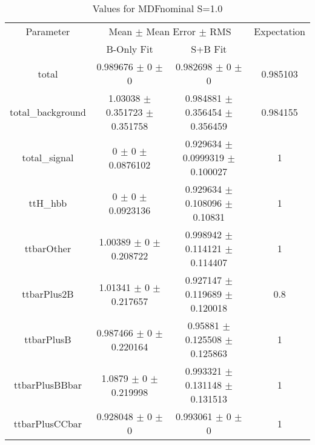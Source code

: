 \begin{table}
\centering
\caption{Values for MDFnominal S=1.0}
\begin{tabular}{cccc}
\toprule
Parameter & \multicolumn{2}{c}{Mean $\pm$ Mean Error $\pm$ RMS} & Expectation\\
 & B-Only Fit & S+B Fit & \\
\midrule
total & \num{0.989676} $\pm$ \num{0} $\pm$ \num{0} & \num{0.982698} $\pm$ \num{0} $\pm$ \num{0} & \num{0.985103}\\
total\_background & \num{1.03038} $\pm$ \num{0.351723} $\pm$ \num{0.351758} & \num{0.984881} $\pm$ \num{0.356454} $\pm$ \num{0.356459} & \num{0.984155}\\
total\_signal & \num{0} $\pm$ \num{0} $\pm$ \num{0.0876102} & \num{0.929634} $\pm$ \num{0.0999319} $\pm$ \num{0.100027} & \num{1}\\
ttH\_hbb & \num{0} $\pm$ \num{0} $\pm$ \num{0.0923136} & \num{0.929634} $\pm$ \num{0.108096} $\pm$ \num{0.10831} & \num{1}\\
ttbarOther & \num{1.00389} $\pm$ \num{0} $\pm$ \num{0.208722} & \num{0.998942} $\pm$ \num{0.114121} $\pm$ \num{0.114407} & \num{1}\\
ttbarPlus2B & \num{1.01341} $\pm$ \num{0} $\pm$ \num{0.217657} & \num{0.927147} $\pm$ \num{0.119689} $\pm$ \num{0.120018} & \num{0.8}\\
ttbarPlusB & \num{0.987466} $\pm$ \num{0} $\pm$ \num{0.220164} & \num{0.95881} $\pm$ \num{0.125508} $\pm$ \num{0.125863} & \num{1}\\
ttbarPlusBBbar & \num{1.0879} $\pm$ \num{0} $\pm$ \num{0.219998} & \num{0.993321} $\pm$ \num{0.131148} $\pm$ \num{0.131513} & \num{1}\\
ttbarPlusCCbar & \num{0.928048} $\pm$ \num{0} $\pm$ \num{0} & \num{0.993061} $\pm$ \num{0} $\pm$ \num{0} & \num{1}\\
\bottomrule
\end{tabular}
\end{table}